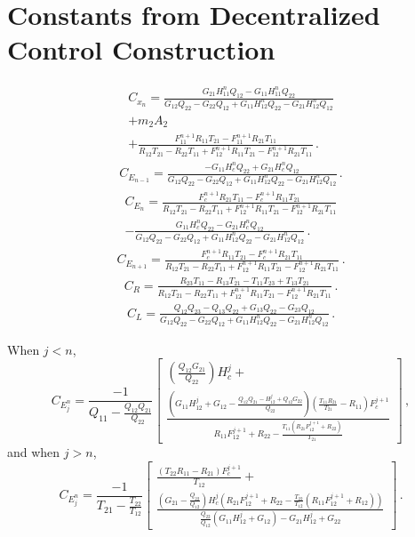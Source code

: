 \documentclass[11pt]{ucthesis}
\begin{document}
\chapter{Constants from Decentralized Control Construction}
\[
\begin{matrix}
C_{x_n} = \frac{G_{21}H_{11}^nQ_{12}-G_{11}H_{11}^nQ_{22}}{G_{12}Q_{22}-G_{22}Q_{12}+G_{11}H_{12}^nQ_{22}-G_{21}H_{12}^nQ_{12}}\\+m_2A_2\\+\frac{F_{11}^{n+1}R_{11}T_{21}-F_{11}^{n+1}R_{21}T_{11}}{R_{12}T_{21}-R_{22}T_{11}+F_{12}^{n+1}R_{11}T_{21}-F_{12}^{n+1}R_{21}T_{11}} \,.
\end{matrix}
\]
\[
\begin{matrix}
C_{E_{n-1}}= \frac{-G_{11}H_c^nQ_{22}+G_{21}H_c^nQ_{12}}{G_{12}Q_{22}-G_{22}Q_{12}+G_{11}H_{12}^nQ_{22}-G_{21}H_{12}^nQ_{12}} \,.
\end{matrix}
\]
\[
\begin{matrix}
C_{E_n} = \frac{F_c^{n+1}R_{21}T_{11}-F_c^{n+1}R_{11}T_{21}}{R_{12}T_{21}-R_{22}T_{11}+F_{12}^{n+1}R_{11}T_{21}-F_{12}^{n+1}R_{21}T_{11}}\\-\frac{G_{11}H_c^nQ_{22}-G_{21}H_c^nQ_{12}}{G_{12}Q_{22}-G_{22}Q_{12}+G_{11}H_{12}^nQ_{22}-G_{21}H_{12}^nQ_{12}} \,.
\end{matrix}
\]
\[
\begin{matrix}
C_{E_{n+1}} = \frac{F_c^{n+1}R_{11}T_{21}-F_c^{n+1}R_{21}T_{11}}{R_{12}T_{21}-R_{22}T_{11}+F_{12}^{n+1}R_{11}T_{21}-F_{12}^{n+1}R_{21}T_{11}} \,.
\end{matrix}
\]
\[
\begin{matrix}
C_R = \frac{R_{23}T_{11}-R_{13}T_{21}-T_{11}T_{23}+T_{13}T_{21}}{R_{12}T_{21}-R_{22}T_{11}+F_{12}^{n+1}R_{11}T_{21}-F_{12}^{n+1}R_{21}T_{11}} \,.
\end{matrix}
\]
\[
\begin{matrix}
C_L = \frac{Q_{12}Q_{23}-Q_{13}Q_{22}+G_{13}Q_{22}-G_{23}Q_{12}}{G_{12}Q_{22}-G_{22}Q_{12}+G_{11}H_{12}^nQ_{22}-G_{21}H_{12}^nQ_{12}} \,.
\end{matrix}
\]

When $j<n$,
\[
C_{E_j^n} = \frac{-1}{Q_{11}-\frac{Q_{12}Q_{21}}{Q_{22}}}\left[\begin{matrix}\left(\frac{Q_{12}G_{21}}{Q_{22}}\right)H_c^j+\\\frac{\left(G_{11}H_{12}^j+G_{12}-\frac{Q_{12}Q_{21}-H_{12}^j+Q_{12}G_{22}}{Q_{22}}\right)\left(\frac{T_{11}R_{21}}{T_{21}}-R_{11}\right)F_c^{j+1}}{R_{11}F_{12}^{j+1}+R_{22}-\frac{T_{11}(R_{21}F_{12}^{j+1}+R_{22})}{T_{21}}}\end{matrix}\right] \,,
\]
and when $j>n$,
\[
C_{E_j^n} = \frac{-1}{T_{21}-\frac{T_{22}}{T_{12}}}\left[\begin{matrix}\frac{(T_{22}R_{11}-R_{21})F_c^{j+1}}{T_{12}}+\\\frac{\left(G_{21}-\frac{Q_{22}}{Q_{12}}\right)H_c^j\left(R_{21}F_{12}^{j+1}+R_{22}-\frac{T_{22}}{T_{12}}\left(R_{11}F_{12}^{j+1}+R_{12}\right)\right)}{\frac{Q_{22}}{Q_{12}}\left(G_{11}H_{12}^j+G_{12}\right)-G_{21}H_{12}^j+G_{22}}\end{matrix}\right] \,.
\]
\end{document}

